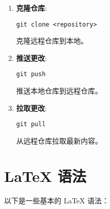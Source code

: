 \documentclass{ctexart}
\begin{document}
\begin{enumerate}[label=\arabic*.]
\item \textbf{克隆仓库}:
\begin{lstlisting}
git clone <repository>
\end{lstlisting}
克隆远程仓库到本地。

\item \textbf{推送更改}:
\begin{lstlisting}
git push
\end{lstlisting}
推送本地仓库到远程仓库。

\item \textbf{拉取更改}:
\begin{lstlisting}
git pull
\end{lstlisting}
从远程仓库拉取最新内容。
\end{enumerate}

\section{LaTeX 语法}
以下是一些基本的 LaTeX 语法：
\end{document}
